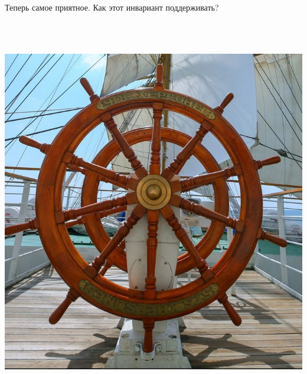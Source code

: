 Теперь самое приятное. Как этот инвариант поддерживать?


\begin{center}
   \includegraphics[width=17cm, height=17cm]{assets/wheel.jpg}
\end{center}